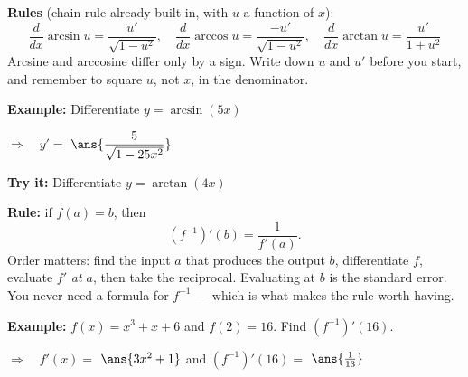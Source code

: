 \documentclass[12pt]{article}
\begin{document}


\begin{formulabox}
\textbf{Rules} (chain rule already built in, with $u$ a function of $x$):
\[
  \frac{d}{dx}\arcsin u = \frac{u'}{\sqrt{1-u^2}}, \quad
  \frac{d}{dx}\arccos u = \frac{-u'}{\sqrt{1-u^2}}, \quad
  \frac{d}{dx}\arctan u = \frac{u'}{1+u^2}
\]
Arcsine and arccosine differ only by a sign. Write down $u$ and $u'$ before you
start, and remember to square $u$, not $x$, in the denominator.
\end{formulabox}

\begin{examplebox}
\textbf{Example:} \quad Differentiate $y = \arcsin(5x)$

$\Rightarrow\quad y' = $ $\ans{\dfrac{5}{\sqrt{1-25x^2}}}$
\end{examplebox}

\begin{tryitbox}
\textbf{Try it:} \quad Differentiate $y = \arctan(4x)$\\[2pt]
\end{tryitbox}


\begin{formulabox}
\textbf{Rule:} if $f(a) = b$, then
\[
  \left(f^{-1}\right)'(b) = \frac{1}{f'(a)} .
\]
Order matters: find the input $a$ that produces the output $b$, differentiate
$f$, evaluate $f'$ \emph{at $a$}, then take the reciprocal. Evaluating at $b$ is
the standard error. You never need a formula for $f^{-1}$ --- which is what makes
the rule worth having.
\end{formulabox}

\begin{examplebox}
\textbf{Example:} \quad $f(x) = x^3 + x + 6$ and $f(2) = 16$. Find
$\left(f^{-1}\right)'(16)$.

$\Rightarrow\quad f'(x) = $ $\ans{3x^2+1}$ \quad and \quad $\left(f^{-1}\right)'(16) = $ $\ans{\tfrac{1}{13}}$
\end{examplebox}
\end{document}
